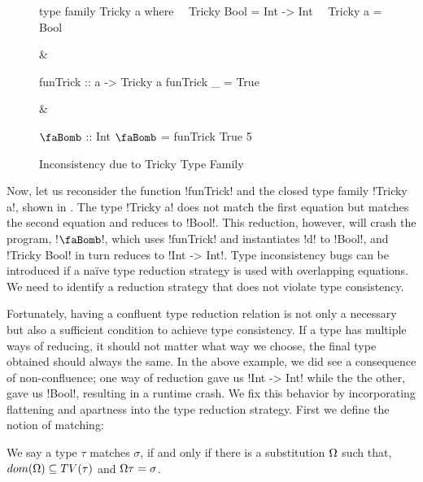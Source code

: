 \documentclass[format=acmsmall,manuscript,screen,nonacm,margin=1in,11pt]{acmart}
\begin{document}
\begin{figure}[ht]
  \small
  \begin{tabularx}\textwidth{X X X} 
\begin{code}^^J
type family Tricky a where^^J
\ \ Tricky Bool = Int -> Int^^J
\ \ Tricky a    = Bool^^J
\end{code}&
\begin{code}^^J
funTrick :: a -> Tricky a^^J
funTrick _ = True^^J
\end{code}&
\begin{code}^^J
$\text{\faBomb}$ :: Int^^J 
$\text{\faBomb}$ = funTrick True 5^^J
\end{code}
\end{tabularx}
  \caption{Inconsistency due to Tricky Type Family}
  \label{fig:closed-tf-tricky}
\end{figure}

Now, let us reconsider the function !funTrick! and the closed type family !Tricky a!, shown in .
The type !Tricky a! does not match the first equation but matches the second equation and reduces to !Bool!.
This reduction, however, will crash the program, !$\text{\faBomb}$!, which uses !funTrick!
and instantiates !d! to !Bool!, and !Tricky Bool! in turn reduces to !Int -> Int!.
Type inconsistency bugs can be introduced if a na\"ive type reduction strategy
is used with overlapping equations. We need to identify a reduction strategy that does not violate type consistency.

Fortunately, having a confluent type reduction relation is not only a necessary but also a sufficient condition
to achieve type consistency\cite{bezem_term_2003}. If a type has multiple ways of reducing,
it should not matter what way we choose, the final type obtained should always the same. %
In the above example, we did see a consequence of non-confluence; one way of reduction
gave us !Int -> Int! while the the other, gave us !Bool!, resulting in a runtime crash.
We fix this behavior by incorporating flattening and apartness into the type reduction strategy.
First we define the notion of matching:
\begin{defn}\label{def:ctf-match}
  We say a type $\tau$ matches $\sigma$, if and only if there is a substitution
  $\Omega$ such that, $dom(\Omega) \subseteq TV(\tau)$ and $\Omega\tau = \sigma$.
\end{defn}
\end{document}
